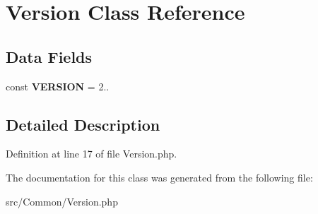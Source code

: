\hypertarget{class_zest_1_1_common_1_1_version}{}\section{Version Class Reference}
\label{class_zest_1_1_common_1_1_version}
\subsection*{Data Fields}
\begin{DoxyCompactItemize}
\item 
\mbox{\label{class_zest_1_1_common_1_1_version_af71005841ce53adac00581ab0ba24c1f}} 
const {\bfseries V\+E\+R\+S\+I\+ON} = \textquotesingle{}2..\textquotesingle{}
\end{DoxyCompactItemize}


\subsection{Detailed Description}


Definition at line 17 of file Version.\+php.



The documentation for this class was generated from the following file\+:\begin{DoxyCompactItemize}
\item 
src/\+Common/Version.\+php\end{DoxyCompactItemize}

